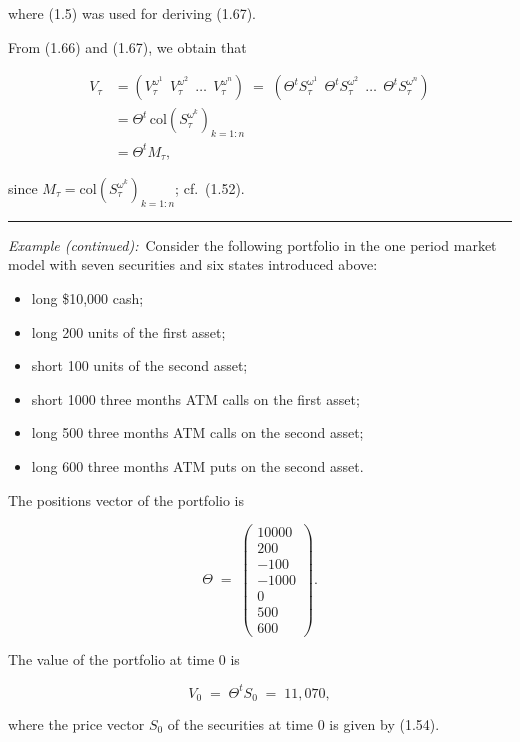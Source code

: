 where (1.5) was used for deriving (1.67).

From (1.66) and (1.67), we obtain that

\begin{equation}
\begin{aligned}
V_\tau &= \left(V_\tau^{\omega^1}\ \ V_\tau^{\omega^2}\ \ \ldots\ \ V_\tau^{\omega^n}\right)
\;=\; \left(\Theta^tS_\tau^{\omega^1}\ \ \Theta^tS_\tau^{\omega^2}\ \ \ldots\ \ \Theta^tS_\tau^{\omega^n}\right) \\
&= \Theta^t\,\mathrm{col}\left(S_\tau^{\omega^k}\right)_{k=1:n} \\
&= \Theta^tM_\tau,
\end{aligned}
\end{equation}

since $M_\tau=\mathrm{col}\left(S_\tau^{\omega^k}\right)_{k=1:n}$; cf.\
(1.52).

\medskip
\noindent\rule{\linewidth}{0.4pt}
\medskip

\noindent\textit{Example (continued):}\ Consider the following portfolio in
the one period market model with seven securities and six states
introduced above:
\begin{itemize}
\item long \$10,000 cash;
\item long 200 units of the first asset;
\item short 100 units of the second asset;
\item short 1000 three months ATM calls on the first asset;
\item long 500 three months ATM calls on the second asset;
\item long 600 three months ATM puts on the second asset.
\end{itemize}

The positions vector of the portfolio is

\[
\Theta \;=\; \begin{pmatrix}10000\\200\\-100\\-1000\\0\\500\\600\end{pmatrix}.
\]

The value of the portfolio at time 0 is

\[
V_0 \;=\; \Theta^tS_0 \;=\; 11{,}070,
\]

where the price vector $S_0$ of the securities at time 0 is given by
(1.54).


